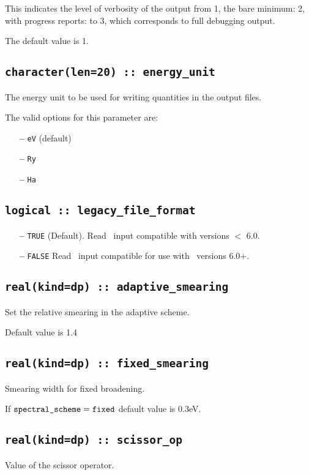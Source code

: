 \documentclass[a4paper,11pt,twoside]{book}
\begin{document}
This indicates the level of verbosity of the output from 1,
the bare minimum: 2, with progress reports: to 3, which corresponds to full debugging output.

The default value is 1.


\subsection[energy\_unit]{\tt character(len=20) :: energy\_unit}
The energy unit to be used for writing quantities in the output files.

The valid options for this parameter are:
\begin{itemize}
\item[{\bf --}]  \verb#eV# (default)
\item[{\bf --}]  \verb#Ry#
\item[{\bf --}]  \verb#Ha#
\end{itemize}

\subsection[adaptive\_smearing]{\tt logical :: legacy\_file\_format}
\begin{itemize}
\item[{\bf --}] \verb#TRUE# (Default).  Read \castep\ input compatible with versions $<$ 6.0.
\item[{\bf --}] \verb#FALSE# Read \castep\ input compatible for use with \castep\ versions 6.0$+$. 
\end{itemize}

\subsection[adaptive\_smearing]{\tt real(kind=dp) :: adaptive\_smearing}
Set the relative smearing in the adaptive scheme.

Default value is 1.4

\subsection[fixed\_smearing]{\tt real(kind=dp) :: fixed\_smearing}
Smearing width for fixed broadening.

If $\verb#spectral_scheme# = \verb#fixed#$ default value is 0.3eV.

\subsection[scissor\_op]{\tt real(kind=dp) :: scissor\_op}
Value of the scissor operator. 
\end{document}
